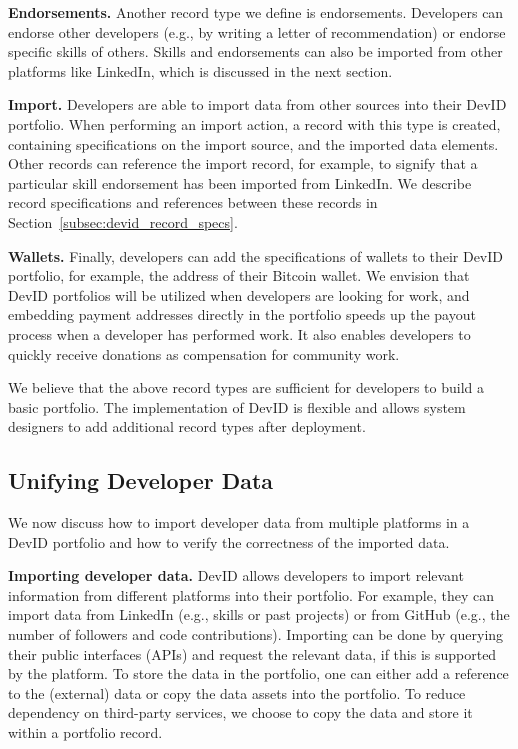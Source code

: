 \textbf{Endorsements.}
Another record type we define is endorsements.
Developers can endorse other developers (e.g., by writing a letter of recommendation) or endorse specific skills of others.
Skills and endorsements can also be imported from other platforms like LinkedIn, which is discussed in the next section.

\textbf{Import.}
Developers are able to import data from other sources into their DevID portfolio.
When performing an import action, a record with this type is created, containing specifications on the import source, and the imported data elements.
Other records can reference the import record, for example, to signify that a particular skill endorsement has been imported from LinkedIn.
We describe record specifications and references between these records in Section~\ref{subsec:devid_record_specs}.

\textbf{Wallets.}
Finally, developers can add the specifications of wallets to their DevID portfolio, for example, the address of their Bitcoin wallet.
We envision that DevID portfolios will be utilized when developers are looking for work, and embedding payment addresses directly in the portfolio speeds up the payout process when a developer has performed work.
It also enables developers to quickly receive donations as compensation for community work.

We believe that the above record types are sufficient for developers to build a basic portfolio.
The implementation of DevID is flexible and allows system designers to add additional record types after deployment.

\subsection{Unifying Developer Data}
\label{subsec:unifying_data}
We now discuss how to import developer data from multiple platforms in a DevID portfolio and how to verify the correctness of the imported data.

\textbf{Importing developer data.}
DevID allows developers to import relevant information from different platforms into their portfolio.
For example, they can import data from LinkedIn (e.g., skills or past projects) or from GitHub (e.g., the number of followers and code contributions).
Importing can be done by querying their public interfaces (APIs) and request the relevant data, if this is supported by the platform.
To store the data in the portfolio, one can either add a reference to the (external) data or copy the data assets into the portfolio.
To reduce dependency on third-party services, we choose to copy the data and store it within a portfolio record.

